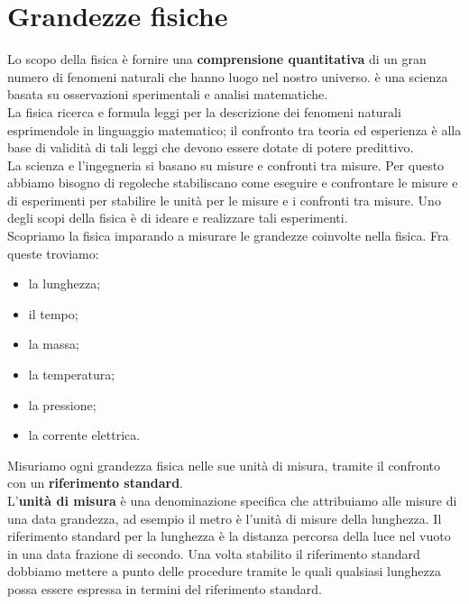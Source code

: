 \documentclass[12pt]{report}
\begin{document}
	\chapter{Grandezze fisiche}
	Lo scopo della fisica è  fornire una \textbf{comprensione quantitativa} di un gran numero di fenomeni naturali che hanno luogo nel nostro universo. è  una scienza basata su osservazioni sperimentali e analisi matematiche. \\
	La fisica ricerca e formula leggi per la descrizione dei fenomeni naturali esprimendole in linguaggio matematico; il confronto tra teoria ed esperienza è  alla base di validità di tali leggi che devono essere dotate di potere predittivo. \\
	La scienza e l'ingegneria si basano su misure e confronti tra misure. Per questo abbiamo bisogno di regoleche stabiliscano come eseguire e confrontare le misure e di esperimenti per stabilire le unità per le misure e i confronti tra misure. Uno degli scopi della fisica è  di ideare e realizzare tali esperimenti. \\
	Scopriamo la fisica imparando a misurare le grandezze coinvolte nella fisica. Fra queste troviamo:
	\begin{itemize}
		\item la lunghezza;
		\item il tempo;
		\item la massa;
		\item la temperatura;
		\item la pressione;
		\item la corrente elettrica.
	\end{itemize}
	Misuriamo ogni grandezza fisica nelle sue unità di misura, tramite il confronto con un \textbf{riferimento standard}. \\
	L'\textbf{unità di misura} è  una denominazione specifica che attribuiamo alle misure di una data grandezza, ad esempio il metro è  l'unità di misure della lunghezza. Il riferimento standard per la lunghezza è  la distanza percorsa della luce nel vuoto in una data frazione di secondo. Una volta stabilito il riferimento standard dobbiamo mettere a punto delle procedure tramite le quali qualsiasi lunghezza possa essere espressa in termini del riferimento standard. \\
\end{document}

